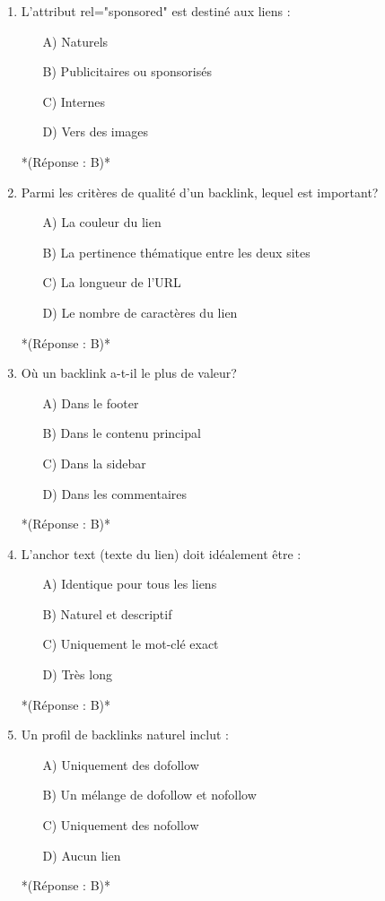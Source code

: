 \documentclass[12pt,a4paper,twoside]{report}
\begin{document}
\begin{enumerate}
\item L'attribut rel="sponsored" est destiné aux liens :
\begin{itemize}
\item[A)] Naturels
\item[B)] Publicitaires ou sponsorisés
\item[C)] Internes
\item[D)] Vers des images
\end{itemize}
*(Réponse : B)*

\item Parmi les critères de qualité d'un backlink, lequel est important?
\begin{itemize}
\item[A)] La couleur du lien
\item[B)] La pertinence thématique entre les deux sites
\item[C)] La longueur de l'URL
\item[D)] Le nombre de caractères du lien
\end{itemize}
*(Réponse : B)*

\item Où un backlink a-t-il le plus de valeur?
\begin{itemize}
\item[A)] Dans le footer
\item[B)] Dans le contenu principal
\item[C)] Dans la sidebar
\item[D)] Dans les commentaires
\end{itemize}
*(Réponse : B)*

\item L'anchor text (texte du lien) doit idéalement être :
\begin{itemize}
\item[A)] Identique pour tous les liens
\item[B)] Naturel et descriptif
\item[C)] Uniquement le mot-clé exact
\item[D)] Très long
\end{itemize}
*(Réponse : B)*

\item Un profil de backlinks naturel inclut :
\begin{itemize}
\item[A)] Uniquement des dofollow
\item[B)] Un mélange de dofollow et nofollow
\item[C)] Uniquement des nofollow
\item[D)] Aucun lien
\end{itemize}
*(Réponse : B)*


\end{enumerate}
\end{document}

